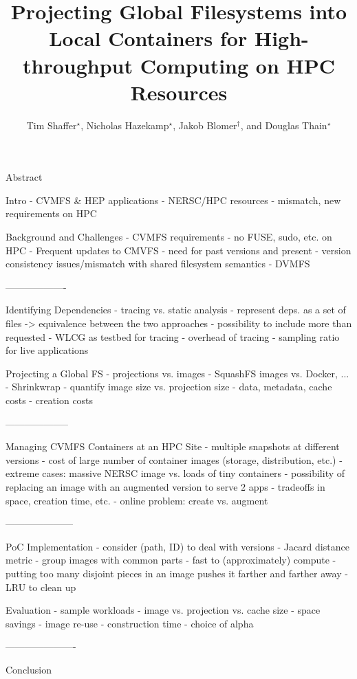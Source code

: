 \documentclass[sigconf]{acmart}
\begin{document}
\title[Projecting Global Filesystems into Local Containers.]{Projecting Global Filesystems into Local Containers for High-throughput Computing on HPC Resources}


Abstract

Intro
- CVMFS & HEP applications
- NERSC/HPC resources
- mismatch, new requirements on HPC

Background and Challenges
- CVMFS requirements
- no FUSE, sudo, etc. on HPC
- Frequent updates to CMVFS
- need for past versions and present
- version consistency issues/mismatch with shared filesystem semantics
- DVMFS

-------------------

Identifying Dependencies
- tracing vs. static analysis
- represent deps. as a set of files -> equivalence between the two approaches
- possibility to include more than requested
- WLCG as testbed for tracing
- overhead of tracing
- sampling ratio for live applications

Projecting a Global FS
- projections vs. images
- SquashFS images vs. Docker, ...
- Shrinkwrap
- quantify image size vs. projection size
- data, metadata, cache costs
- creation costs

--------------------

Managing CVMFS Containers at an HPC Site
- multiple snapshots at different versions
- cost of large number of container images (storage, distribution, etc.)
- extreme cases: massive NERSC image vs. loads of tiny containers
- possibility of replacing an image with an augmented version to serve 2 apps
- tradeoffs in space, creation time, etc.
- online problem: create vs. augment

---------------------

PoC Implementation
- consider (path, ID) to deal with versions
- Jacard distance metric
- group images with common parts
- fast to (approximately) compute
- putting too many disjoint pieces in an image pushes it farther and farther away
- LRU to clean up

Evaluation
- sample workloads
- image vs. projection vs. cache size
- space savings
- image re-use
- construction time
- choice of alpha

----------------------

Conclusion

\fi

\author{Tim Shaffer$^\star$, Nicholas Hazekamp$^\star$, Jakob Blomer$^\dagger$, and Douglas Thain$^\star$}
\end{document}
